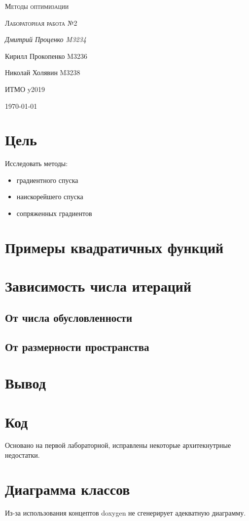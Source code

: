\documentclass[russian, english]{article}
\begin{document}
\begin{titlepage}
\centering
	{\scshape\LARGE Методы оптимизации \par}
	\vspace{1cm}
	{\scshape\Large Лабораторная работа №2\par}
	\vspace{2cm}
	{\Large\itshape Дмитрий Проценко M3234 \par
	Кирилл Прокопенко M3236 \par
	Николай Холявин M3238 \par}
	\vfill
	ИТМО y2019
	\vfill
	{\large \today\par}
\end{titlepage}

\tableofcontents
\newpage

\section{Цель}
Исследовать методы:
\begin{itemize}
	\item градиентного спуска
	\item наискорейшего спуска
	\item сопряженных градиентов
\end{itemize}

\section{Примеры квадратичных функций}
\section{Зависимость числа итераций}
\subsection{От числа обусловленности}
\subsection{От размерности пространства}

\section{Вывод}


\appendix
\section{Код}
Основано на первой лабораторной, исправлены некоторые архитекнутрные недостатки.

\section{Диаграмма классов}
Из-за использования концептов doxygen не сгенерирует адекватную диаграмму.

\end{document}
